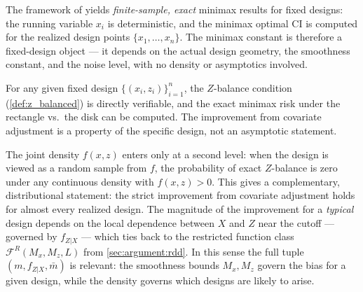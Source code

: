 \begin{remark}\label{rem:fixed_design_constant}
	The framework of \textcite{armstrong_optimal_2018} yields \emph{finite-sample, exact} minimax results for fixed designs: the running variable $x_i$ is deterministic, and the minimax optimal CI is computed for the realized design points $\{x_1, \ldots, x_n\}$.
	The minimax constant is therefore a fixed-design object --- it depends on the actual design geometry, the smoothness constant, and the noise level, with no density or asymptotics involved.

	For any given fixed design $\{(x_i, z_i)\}_{i=1}^n$, the $Z$-balance condition (\cref{def:z_balanced}) is directly verifiable, and the exact minimax risk under the rectangle vs.\ the disk can be computed.
	The improvement from covariate adjustment is a property of the specific design, not an asymptotic statement.

	The joint density $f(x, z)$ enters only at a second level: when the design is viewed as a random sample from $f$, the probability of exact $Z$-balance is zero under any continuous density with $f(x, z) > 0$.
	This gives a complementary, distributional statement: the strict improvement from covariate adjustment holds for almost every realized design.
	The magnitude of the improvement for a \emph{typical} design depends on the local dependence between $X$ and $Z$ near the cutoff --- governed by $f_{Z|X}$ --- which ties back to the restricted function class $\mathcal{F}^R(M_x, M_z, L)$ from \cref{sec:argument:rdd}.
	In this sense the full tuple $(m, f_{Z|X}, \bar{m})$ is relevant: the smoothness bounds $M_x, M_z$ govern the bias for a given design, while the density governs which designs are likely to arise.
\end{remark}


